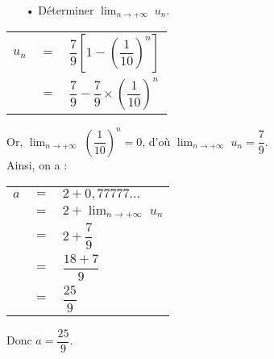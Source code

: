 \begin{itemize}
\item[•] Déterminer $\displaystyle {\lim_{n \rightarrow +\infty}} \; u_n$.
\end{itemize}

\vspace*{.3cm}

\begin{tabular}{lll}
$u_n$ & $=$ & $\dfrac{7}{9}\left[1-\left(\dfrac{1}{10}\right)^n\right]$ \vspace*{.3cm} \\
& $=$ & $\dfrac{7}{9} - \dfrac{7}{9} \times \left(\dfrac{1}{10}\right)^n$ \vspace*{.3cm} \\
\end{tabular}

Or, $\displaystyle {\lim_{n \rightarrow +\infty}} \; \left(\dfrac{1}{10}\right)^n = 0$, d'où $\displaystyle {\lim_{n \rightarrow +\infty}} \; u_n = \dfrac{7}{9}$. \vspace*{.3cm} \\

Ainsi, on a : \\

\begin{tabular}{lll}
$a$ & $=$ & $2 + 0,77777...$ \vspace*{.3cm} \\
& $=$ & $2 + \displaystyle {\lim_{n \rightarrow +\infty}} \; u_n$ \vspace*{.3cm} \\
& $=$ & $2 + \dfrac{7}{9}$ \vspace*{.3cm} \\
& $=$ & $\dfrac{18 + 7}{9}$ \vspace*{.3cm} \\
& $=$ & $\dfrac{25}{9}$ \\
\end{tabular}

\vspace*{.3cm}

Donc $a = \dfrac{25}{9}$.

\vspace*{-5cm}